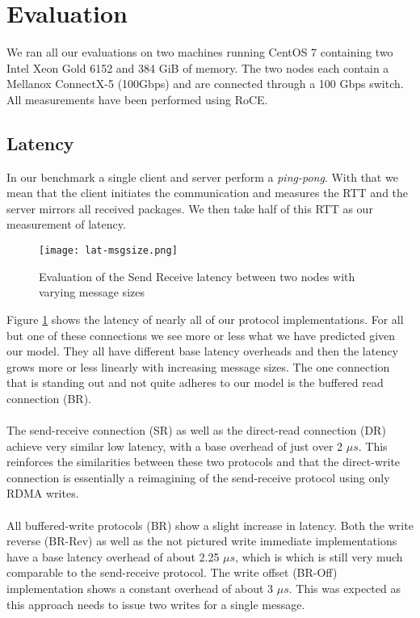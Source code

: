 \section{Evaluation}

We ran all our evaluations on two machines running CentOS 7 containing two Intel Xeon Gold 6152 and 384 GiB of memory.
The two nodes each contain a Mellanox ConnectX-5 (100Gbps) and are connected through a 100 Gbps switch. All measurements
have been performed using RoCE.

\subsection{Latency}

 In our benchmark a single client and server perform a \emph{ping-pong}. With that 
we mean that the client initiates the communication and measures the RTT and the server mirrors all received packages. 
We then take half of this RTT as our measurement of latency.

\begin{figure}[h]
\texttt{[image: lat-msgsize.png]}
\caption{Evaluation of the Send Receive latency between two nodes with varying message sizes}
\label{fig:plot-lat}
\end{figure}


Figure \ref{fig:plot-lat} shows the latency of nearly all of our protocol implementations. For all but one of these 
connections we see more or less what we have predicted given our model. They all have different base latency overheads
and then the latency grows more or less linearly with increasing message sizes. The one connection that is standing out
and not quite adheres to our model is the buffered read connection (BR).

\paragraph{} The send-receive connection (SR) as well as the direct-read connection (DR) achieve very similar low latency,
with a base overhead of just over 2 $\mu s$. This reinforces the similarities between these two protocols and that the 
direct-write connection is essentially a reimagining of the send-receive protocol using only RDMA writes.



\paragraph{} All buffered-write protocols (BR) show a slight increase in latency. Both the write reverse (BR-Rev) as well 
as the not pictured write immediate implementations have a base latency overhead of about 2.25 $\mu s$, which is which is
still very much comparable to the send-receive protocol. The write offset (BR-Off) implementation shows a constant overhead 
of about 3 $\mu s$. This was expected as this approach needs to issue two writes for a single message.


